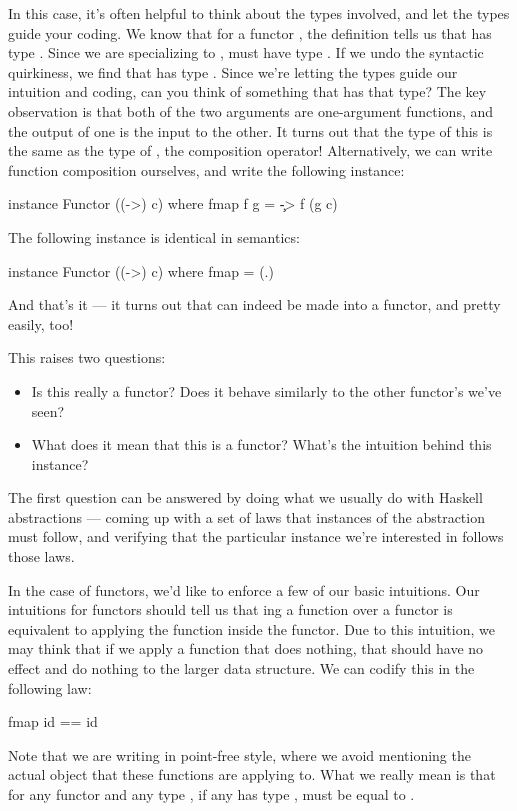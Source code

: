 In this case, it's often helpful to think about the types involved, and let the types guide your
coding. We know that for a functor , the definition tells us that  has type
. Since we are specializing  to ,
 must have type . If we undo the syntactic
quirkiness, we find that  has type . Since
we're letting the types guide our intuition and coding, can you think of something that has that
type? The key observation is that both of the two arguments are one-argument functions, and the
output of one is the input to the other. It turns out that the type of this  is the
same as the type of , the composition operator!  Alternatively, we can write function
composition ourselves, and write the following instance:
\begin{haskell}
instance Functor ((->) c) where
  fmap f g = \c -> f (g c)
\end{haskell}
The following instance is identical in semantics:
\begin{haskell}
instance Functor ((->) c) where
  fmap = (.)
\end{haskell}
And that's it --- it turns out that  can indeed be made into a functor, and pretty
easily, too!

This raises two questions:
\begin{itemize}
    \item Is this really a functor? Does it behave similarly to the other functor's we've seen?
    \item What does it mean that this is a functor? What's the intuition behind this instance?
\end{itemize}

The first question can be answered by doing what we usually do with Haskell abstractions --- coming
up with a set of laws that instances of the abstraction must follow, and verifying that the
particular instance we're interested in follows those laws.

In the case of functors, we'd like to enforce a few of our basic intuitions. Our intuitions for
functors should tell us that ing a function over a functor is equivalent to applying
the function inside the functor. Due to this intuition, we may think that if we apply a function
that does nothing, that should have no effect and do nothing to the larger data structure. We can
codify this in the following law:
\begin{haskell}
fmap id == id
\end{haskell}
Note that we are writing in point-free style, where we avoid mentioning the actual object that these
functions are applying to. What we really mean is that for any functor  and any type
, if any  has type ,  must be equal to .

